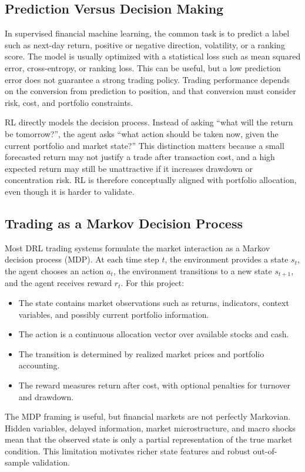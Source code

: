 \documentclass[11pt]{article}
\begin{document}
\subsection{Prediction Versus Decision Making}
In supervised financial machine learning, the common task is to predict a label such as next-day return, positive or negative direction, volatility, or a ranking score. The model is usually optimized with a statistical loss such as mean squared error, cross-entropy, or ranking loss. This can be useful, but a low prediction error does not guarantee a strong trading policy. Trading performance depends on the conversion from prediction to position, and that conversion must consider risk, cost, and portfolio constraints.

RL directly models the decision process. Instead of asking ``what will the return be tomorrow?'', the agent asks ``what action should be taken now, given the current portfolio and market state?'' This distinction matters because a small forecasted return may not justify a trade after transaction cost, and a high expected return may still be unattractive if it increases drawdown or concentration risk. RL is therefore conceptually aligned with portfolio allocation, even though it is harder to validate.

\subsection{Trading as a Markov Decision Process}
Most DRL trading systems formulate the market interaction as a Markov decision process (MDP). At each time step $t$, the environment provides a state $s_t$, the agent chooses an action $a_t$, the environment transitions to a new state $s_{t+1}$, and the agent receives reward $r_t$. For this project:
\begin{itemize}
    \item The state contains market observations such as returns, indicators, context variables, and possibly current portfolio information.
    \item The action is a continuous allocation vector over available stocks and cash.
    \item The transition is determined by realized market prices and portfolio accounting.
    \item The reward measures return after cost, with optional penalties for turnover and drawdown.
\end{itemize}

The MDP framing is useful, but financial markets are not perfectly Markovian. Hidden variables, delayed information, market microstructure, and macro shocks mean that the observed state is only a partial representation of the true market condition. This limitation motivates richer state features and robust out-of-sample validation.
\end{document}
